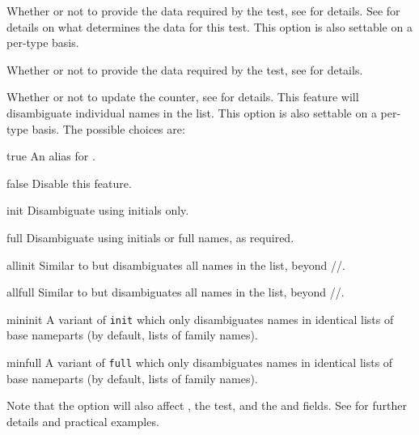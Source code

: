 \documentclass{ltxdockit}[2011/03/25]
\begin{document}
\begin{optionlist}

Whether or not to provide the data required by the  test, see  for details. See  for details on what determines the data for this test.
This option is also settable on a per-type basis.


Whether or not to provide the data required by the  test, see  for details.


Whether or not to update the  counter, see  for details. This feature will disambiguate individual names in the  list. This option is also settable on a per-type basis. The possible choices are:

\begin{valuelist}
\item[true] An alias for .
\item[false] Disable this feature.
\item[init] Disambiguate using initials only.
\item[full] Disambiguate using initials or full names, as required.
\item[allinit] Similar to  but disambiguates all names in the  list, beyond \slash {}\slash {}.
\item[allfull] Similar to  but disambiguates all names in the  list, beyond \slash {}\slash {}.
\item[mininit] A variant of \texttt{init} which only disambiguates names in identical lists of base nameparts (by default, lists of family names).
\item[minfull] A variant of \texttt{full} which only disambiguates names in identical lists of base nameparts (by default, lists of family names).
\end{valuelist}
%
Note that the  option will also affect , the  test, and the  and  fields. See  for further details and practical examples.



\end{optionlist}
\end{document}
